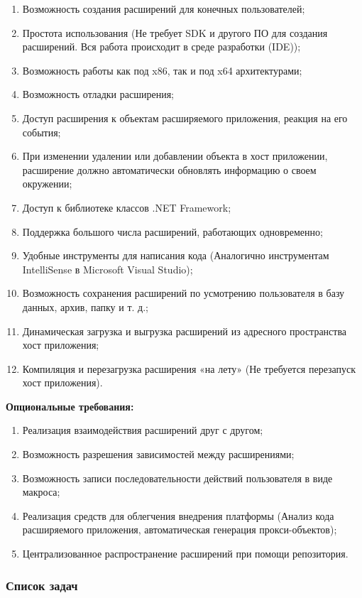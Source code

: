 \label{sec:requirements}
\begin{enumerate}
	\item Возможность создания расширений для конечных пользователей;
	\item Простота использования (Не требует SDK и другого ПО для создания расширений. Вся работа происходит в среде разработки (IDE));
	\item Возможность работы как под x86, так и под x64 архитектурами;
	\item Возможность отладки расширения;
	\item Доступ расширения к объектам расширяемого приложения, реакция на его события;
	\item При изменении удалении или добавлении объекта в хост приложении, расширение должно автоматически обновлять информацию о своем окружении;
	\item Доступ к библиотеке классов .NET Framework;
	\item Поддержка большого числа расширений, работающих одновременно;
	\item Удобные инструменты для написания кода (Аналогично инструментам IntelliSense в Microsoft Visual Studio);
	\item Возможность сохранения расширений по усмотрению пользователя в базу данных, архив, папку и т. д.;
	\item Динамическая загрузка и выгрузка расширений из адресного пространства хост приложения;
	\item Компиляция и перезагрузка расширения «на лету» (Не требуется перезапуск хост приложения).
\end{enumerate}

{\bf Опциональные требования:}
\label{sec:opt_requirements}
\begin{enumerate}
	\item Реализация взаимодействия расширений друг с другом;
	\item Возможность разрешения зависимостей между расширениями;
	\item Возможность записи последовательности действий пользователя в виде макроса;
	\item Реализация средств для облегчения внедрения платформы (Анализ кода расширяемого приложения, автоматическая генерация прокси-объектов);
	\item Централизованное распространение расширений при помощи репозитория.
\end{enumerate}

\subsubsection{Список задач}

